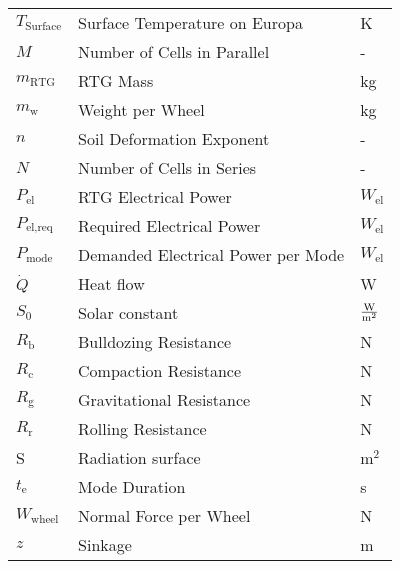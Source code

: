 \begin{longtable}[l]{lll}
\(T_\text{Surface}\)	&	Surface Temperature on Europa				&	K							\\
$M$						&	Number of Cells in Parallel					& -								\\
$m_\text{RTG}$			&	RTG Mass									& kg							\\
\(m_\text{w}\)			&	Weight per Wheel							& kg							\\
\(n\)					&	Soil Deformation Exponent					& -								\\
$N$						&	Number of Cells in Series					& -								\\
$P_\text{el}$			&	RTG Electrical Power						& $W_\text{el}$					\\
$P_\text{el,req}$		&	Required Electrical Power					& $W_\text{el}$					\\
$P_\text{mode}$			&	Demanded Electrical Power per Mode			& $W_\text{el}$					\\
$\dot{Q}$				&	Heat flow									& W								\\
	$S_0$					&	Solar constant 							& $\frac{{\rm W}}{{\rm m}^2}$				\\
\(R_\text{b}\)			&	Bulldozing Resistance						& N								\\
\(R_\text{c}\)			&	Compaction Resistance						& N								\\
\(R_\text{g}\)			&	Gravitational Resistance					& N								\\
\(R_\text{r}\)			&	Rolling Resistance							& N								\\
S						&	Radiation surface							& m$^2$							\\
$t_\text{e}$			&	Mode Duration								& s								\\
\(W_\text{wheel}\)		&	Normal Force per Wheel						& N								\\
\(z\)					&	Sinkage										& m								\\




\end{longtable}
